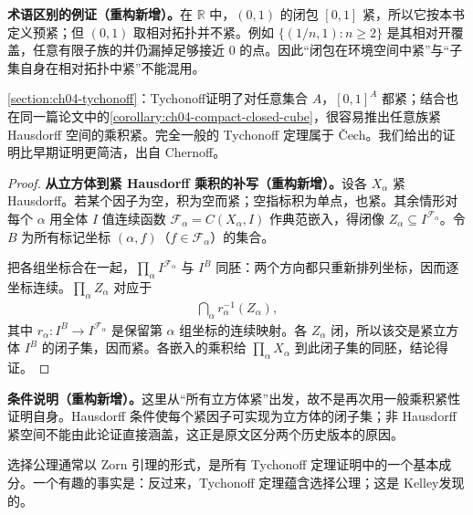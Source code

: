 \documentclass[../../main.tex]{subfiles}
\begin{document}
\begin{remark}
\textbf{术语区别的例证（重构新增）。}在 $\mathbb R$ 中，$(0,1)$ 的闭包 $[0,1]$ 紧，所以它按本书定义预紧；但 $(0,1)$ 取相对拓扑并不紧。例如 $\{(1/n,1):n\ge2\}$ 是其相对开覆盖，任意有限子族的并仍漏掉足够接近 $0$ 的点。因此“闭包在环境空间中紧”与“子集自身在相对拓扑中紧”不能混用。
\end{remark}
\cref{section:ch04-tychonoff}：Tychonoff\cite{folland-bib-151}证明了对任意集合 $A$，$[0,1]^A$ 都紧；结合也在同一篇论文中的\cref{corollary:ch04-compact-closed-cube}，很容易推出任意族紧 Hausdorff 空间的乘积紧。完全一般的 Tychonoff 定理属于 Čech\cite{folland-bib-023}。我们给出的证明比早期证明更简洁，出自 Chernoff\cite{folland-bib-024}。
\begin{proof}
\textbf{从立方体到紧 Hausdorff 乘积的补写（重构新增）。}设各 $X_\alpha$ 紧 Hausdorff。若某个因子为空，积为空而紧；空指标积为单点，也紧。其余情形对每个 $\alpha$ 用全体 $I$ 值连续函数 $\mathcal F_\alpha=C(X_\alpha,I)$ 作典范嵌入，得闭像 $Z_\alpha\subseteq I^{\mathcal F_\alpha}$。令 $B$ 为所有标记坐标 $(\alpha,f)$（$f\in\mathcal F_\alpha$）的集合。

把各组坐标合在一起，$\prod_\alpha I^{\mathcal F_\alpha}$ 与 $I^B$ 同胚：两个方向都只重新排列坐标，因而逐坐标连续。$\prod_\alpha Z_\alpha$ 对应于
\begin{align*}
\bigcap_\alpha r_\alpha^{-1}(Z_\alpha),
\end{align*}
其中 $r_\alpha:I^B\to I^{\mathcal F_\alpha}$ 是保留第 $\alpha$ 组坐标的连续映射。各 $Z_\alpha$ 闭，所以该交是紧立方体 $I^B$ 的闭子集，因而紧。各嵌入的乘积给 $\prod_\alpha X_\alpha$ 到此闭子集的同胚，结论得证。
\end{proof}
\begin{remark}
\textbf{条件说明（重构新增）。}这里从“所有立方体紧”出发，故不是再次用一般乘积紧性证明自身。Hausdorff 条件使每个紧因子可实现为立方体的闭子集；非 Hausdorff 紧空间不能由此论证直接涵盖，这正是原文区分两个历史版本的原因。
\end{remark}
\begin{proposition}\label{proposition:ch04-tychonoff-implies-choice}
选择公理通常以 Zorn 引理的形式，是所有 Tychonoff 定理证明中的一个基本成分。一个有趣的事实是：反过来，Tychonoff 定理蕴含选择公理；这是 Kelley\cite{folland-bib-082}发现的。
\end{proposition}
\end{document}
